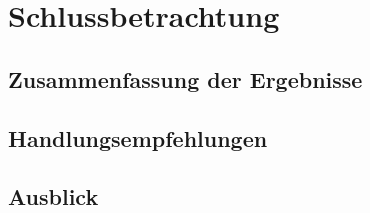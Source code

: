 \newpage
\section{Schlussbetrachtung}

\subsection{Zusammenfassung der Ergebnisse}

\subsection{Handlungsempfehlungen}

\subsection{Ausblick}
